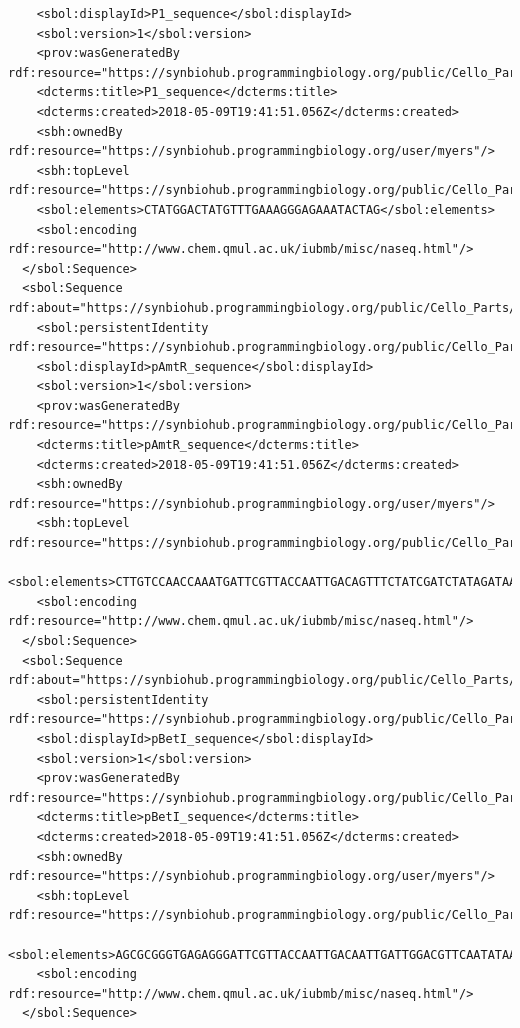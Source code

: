 \begin{lstlisting}
    <sbol:displayId>P1_sequence</sbol:displayId>
    <sbol:version>1</sbol:version>
    <prov:wasGeneratedBy rdf:resource="https://synbiohub.programmingbiology.org/public/Cello_Parts/CelloUCF2sbol_Activity/1"/>
    <dcterms:title>P1_sequence</dcterms:title>
    <dcterms:created>2018-05-09T19:41:51.056Z</dcterms:created>
    <sbh:ownedBy rdf:resource="https://synbiohub.programmingbiology.org/user/myers"/>
    <sbh:topLevel rdf:resource="https://synbiohub.programmingbiology.org/public/Cello_Parts/P1_sequence/1"/>
    <sbol:elements>CTATGGACTATGTTTGAAAGGGAGAAATACTAG</sbol:elements>
    <sbol:encoding rdf:resource="http://www.chem.qmul.ac.uk/iubmb/misc/naseq.html"/>
  </sbol:Sequence>
  <sbol:Sequence rdf:about="https://synbiohub.programmingbiology.org/public/Cello_Parts/pAmtR_sequence/1">
    <sbol:persistentIdentity rdf:resource="https://synbiohub.programmingbiology.org/public/Cello_Parts/pAmtR_sequence"/>
    <sbol:displayId>pAmtR_sequence</sbol:displayId>
    <sbol:version>1</sbol:version>
    <prov:wasGeneratedBy rdf:resource="https://synbiohub.programmingbiology.org/public/Cello_Parts/CelloUCF2sbol_Activity/1"/>
    <dcterms:title>pAmtR_sequence</dcterms:title>
    <dcterms:created>2018-05-09T19:41:51.056Z</dcterms:created>
    <sbh:ownedBy rdf:resource="https://synbiohub.programmingbiology.org/user/myers"/>
    <sbh:topLevel rdf:resource="https://synbiohub.programmingbiology.org/public/Cello_Parts/pAmtR_sequence/1"/>
    <sbol:elements>CTTGTCCAACCAAATGATTCGTTACCAATTGACAGTTTCTATCGATCTATAGATAATGCTAGC</sbol:elements>
    <sbol:encoding rdf:resource="http://www.chem.qmul.ac.uk/iubmb/misc/naseq.html"/>
  </sbol:Sequence>
  <sbol:Sequence rdf:about="https://synbiohub.programmingbiology.org/public/Cello_Parts/pBetI_sequence/1">
    <sbol:persistentIdentity rdf:resource="https://synbiohub.programmingbiology.org/public/Cello_Parts/pBetI_sequence"/>
    <sbol:displayId>pBetI_sequence</sbol:displayId>
    <sbol:version>1</sbol:version>
    <prov:wasGeneratedBy rdf:resource="https://synbiohub.programmingbiology.org/public/Cello_Parts/CelloUCF2sbol_Activity/1"/>
    <dcterms:title>pBetI_sequence</dcterms:title>
    <dcterms:created>2018-05-09T19:41:51.056Z</dcterms:created>
    <sbh:ownedBy rdf:resource="https://synbiohub.programmingbiology.org/user/myers"/>
    <sbh:topLevel rdf:resource="https://synbiohub.programmingbiology.org/public/Cello_Parts/pBetI_sequence/1"/>
    <sbol:elements>AGCGCGGGTGAGAGGGATTCGTTACCAATTGACAATTGATTGGACGTTCAATATAATGCTAGC</sbol:elements>
    <sbol:encoding rdf:resource="http://www.chem.qmul.ac.uk/iubmb/misc/naseq.html"/>
  </sbol:Sequence>

\end{lstlisting}
